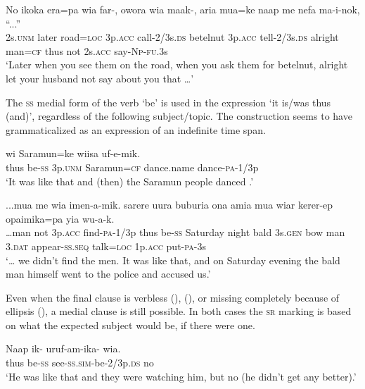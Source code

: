 \ea%
\label{ex:x1496}
\gll No  ikoka  era=pa  wia  far-, owora  wia maak-, aria  mua=ke  naap  me  nefa  ma-i-nok,  ``...'' \\
2s.\textsc{unm} later road=\textsc{loc} 3p.\textsc{acc} call-2/3s.\textsc{ds} betelnut 3p.\textsc{acc} tell-2/3s.\textsc{ds} alright man=\textsc{cf} thus  not  2s.\textsc{acc} say-\textsc{Np}-\textsc{fu}.3s\\
\glt`Later when you see them on the road, when you ask them for betelnut, alright let your husband not say about you that {\dots}'
\z


The \textsc{ss} medial form of the verb `be' is used in the expression   `it is/was thus (and)', regardless of the following subject/topic. The construction seems to have grammaticalized as an expression of an indefinite time span.

\ea%
\label{ex:x1500}
\gll {}    wi  Saramun=ke  wiisa  uf-e-mik. \\
thus  be-\textsc{ss} 3p.\textsc{unm} Saramun=\textsc{cf} dance.name  dance-\textsc{pa}-1/3p      \\
\glt`It was like that and (then) the Saramun people danced .'
\z


\ea%
\label{ex:x1501}
\gll ...mua  me  wia  imen-a-mik.    sarere  uura buburia  ona  amia  mua  wiar  kerer-ep opaimika=pa  yia  wu-a-k.\\
{\dots}man  not  3p.\textsc{acc} find-\textsc{pa}-1/3p  thus  be-\textsc{ss} Saturday night bald 3s.\textsc{gen} bow  man 3.\textsc{dat} appear-\textsc{ss}.\textsc{seq} talk=\textsc{loc} 1p.\textsc{acc} put-\textsc{pa}-3s\\
\glt`{\dots} we didn't find the men. It was like that, and on Saturday evening the bald man himself went to the police and accused us.'
\z


Even when the final clause is verbless (), (), or missing completely because of ellipsis (), a medial clause is still possible. In both cases the \textsc{sr} marking is based on what the expected subject would be, if there were one. 

\ea%
\label{ex:x1497}
\gll Naap  ik-  uruf-am-ika-  wia. \\
thus  be-\textsc{ss} see-\textsc{ss}.\textsc{sim}-be-2/3p.\textsc{ds}  no\\
\glt`He was like that and they were watching him, but no (he didn't get any better).'
\z


